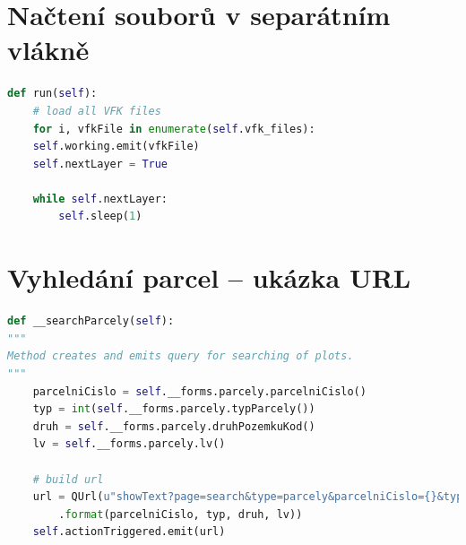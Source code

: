 \documentclass[a4paper,12pt,oneside]{book}
\begin{document}
\section{Načtení souborů v separátním vlákně}
\begin{lstlisting}[language=Python, 
		    keywordstyle=\color{blue}\ttfamily,
		    stringstyle=\color{red}\ttfamily,
		    commentstyle=\color{green}\ttfamily, morekeywords={qDebug,QString,QgsVectorLayer,QgsMapLayerRegistry,QMessageBox,self},
		    label=l_thread_run]
 def run(self):
    # load all VFK files
    for i, vfkFile in enumerate(self.vfk_files):
	self.working.emit(vfkFile)
	self.nextLayer = True

	while self.nextLayer:
	    self.sleep(1)
\end{lstlisting}

\section{Vyhledání parcel -- ukázka URL}
\begin{lstlisting}[language=Python, 
		    keywordstyle=\color{blue}\ttfamily,
		    stringstyle=\color{red}\ttfamily,
		    commentstyle=\color{green}\ttfamily, morekeywords={QUrl,QString,self},
		    label=l_search_parcely]
def __searchParcely(self):
"""
Method creates and emits query for searching of plots.
"""
    parcelniCislo = self.__forms.parcely.parcelniCislo()
    typ = int(self.__forms.parcely.typParcely())
    druh = self.__forms.parcely.druhPozemkuKod()
    lv = self.__forms.parcely.lv()

    # build url
    url = QUrl(u"showText?page=search&type=parcely&parcelniCislo={}&typ={}&druh={}&lv={}"
		.format(parcelniCislo, typ, druh, lv))
    self.actionTriggered.emit(url)
\end{lstlisting}




\end{document}
